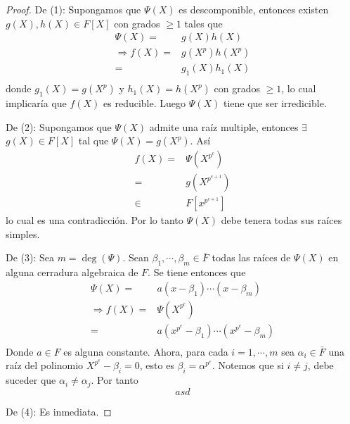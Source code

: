 \documentclass[12pt]{report}
\theoremstyle{largebreak}
\begin{document}
    \begin{proof}
        De (1): Supongamos que $\Psi(X)$ es descomponible, entonces existen $g(X),h(X)\in F[X]$ con grados $\geq1$ tales que
        \begin{equation*}
            \begin{split}
                \Psi(X)=&g(X)h(X)\\
                \Rightarrow f(X)=&g(X^p)h(X^p)\\
                =&g_1(X)h_1(X)\\
            \end{split}
        \end{equation*}
        donde $g_1(X)=g(X^p)$ y $h_1(X)=h(X^p)$ con grados $\geq1$, lo cual implicaría que $f(X)$ es reducible. Luego $\Psi(X)$ tiene que ser irredicible.

        De (2): Supongamos que $\Psi(X)$ admite una raíz multiple, entonces $\exists$ $g(X)\in F[X]$ tal que $\Psi(X)=g(X^p)$. Así
        \begin{equation*}
            \begin{split}
                f(X)=&\Psi(X^{p^{e}})\\
                =&g(X^{p^{e+1}})\\
                \in&F[x^{p^{e+1}}]
            \end{split}
        \end{equation*}
        lo cual es una contradicción. Por lo tanto $\Psi(X)$ debe tenera todas sus raíces simples.

        De (3): Sea $m=\deg(\Psi)$. Sean $\beta_1,\cdots,\beta_m\in\bar{F}$ todas las raíces de $\Psi(X)$ en alguna cerradura algebraica de $F$. Se tiene entonces que
        \begin{equation*}
            \begin{split}
                \Psi(X)=&a\left(x-\beta_1\right)\cdots\left(x-\beta_m\right)\\
                \Rightarrow f(X)=&\Psi(X^{p^e})\\
                =&a\left(x^{p^e}-\beta_1\right)\cdots\left(x^{p^e}-\beta_m\right)\\
            \end{split}
        \end{equation*}
        Donde $a\in F$ es alguna constante. Ahora, para cada $i=1,\cdots,m$ sea $\alpha_i\in\bar{F}$ una raíz del polinomio $X^{p^e}-\beta_i=0$, esto es $\beta_i=\alpha^{p^e}$. Notemos que si $i\neq j$, debe suceder que $\alpha_i\neq\alpha_j$. Por tanto
        \begin{equation*}
            asd
        \end{equation*}

        De (4): Es inmediata.
    \end{proof}
\end{document}
